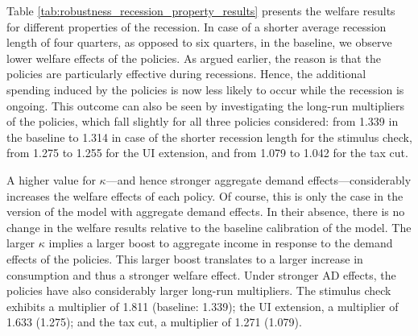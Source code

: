 \documentclass[\econtexRoot/EGMN]{subfiles}
\begin{document}
Table \ref{tab:robustness_recession_property_results} presents the welfare results for different properties of the recession. In case of a shorter average recession length of four quarters, as opposed to six quarters, in the baseline, we observe lower welfare effects of the policies. As argued earlier, the reason is that the policies are particularly effective during recessions. Hence, the additional spending induced by the policies is now less likely to occur while the recession is ongoing. This outcome can also be seen by investigating the long-run multipliers of the policies, which fall slightly for all three policies considered: from 1.339 in the baseline to 1.314 in case of the shorter recession length for the stimulus check, from 1.275 to 1.255 for the UI extension, and from 1.079 to 1.042 for the tax cut.

A higher value for $\kappa$---and hence stronger aggregate demand effects---considerably increases the welfare effects of each policy. Of course, this is only the case in the version of the model with aggregate demand effects. In their absence, there is no change in the welfare results relative to the baseline calibration of the model. The larger $\kappa$ implies a larger boost to aggregate income in response to the demand effects of the policies. This larger boost translates to a larger increase in consumption and thus a stronger welfare effect. Under stronger AD effects, the policies have also considerably larger long-run multipliers. The stimulus check exhibits a multiplier of 1.811 (baseline: 1.339); the UI extension, a multiplier of 1.633 (1.275); and the tax cut, a multiplier of 1.271 (1.079).
\end{document}
